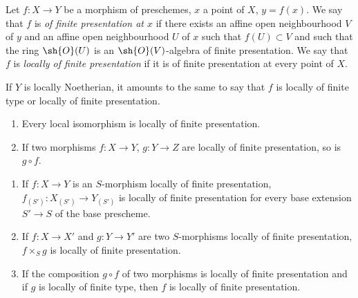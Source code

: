 \begin{definition}[1.4.2]
\label{IV.1.4.2}
Let $f:X\to Y$ be a morphism of preschemes, $x$ a point of $X$, $y=f(x)$.
We say that $f$ is \emph{of finite presentation at $x$} if there exists an affine open neighbourhood $V$ of $y$ and an affine open neighbourhood $U$ of $x$ such that $f(U)\subset V$ and such that the ring $\sh{O}(U)$ is an $\sh{O}(V)$-algebra of finite presentation.
We say that $f$ is \emph{locally of finite presentation} if it is of finite presentation at every point of $X$.
\end{definition}

If $Y$ is locally Noetherian, it amounts to the same to say that $f$ is locally of finite type or locally of finite presentation.

\begin{proposition}[1.4.3]
\label{IV.1.4.3}
\begin{enumerate}
  \item[\rm(i)] Every local isomorphism is locally of finite presentation.
  \item[\rm(ii)] If two morphisms $f:X\to Y$, $g:Y\to Z$ are locally of finite presentation, so is $g\circ f$.
\end{enumerate}
\end{proposition}

\begin{enumerate}
  \item[\rm(iii)] If $f:X\to Y$ is an $S$-morphism locally of finite presentation, $f_{(S')}:X_{(S')}\to Y_{(S')}$ is locally of finite presentation for every base extension $S'\to S$ of the base prescheme.
  \item[\rm(iv)] If $f:X\to X'$ and $g:Y\to Y'$ are two $S$-morphisms locally of finite presentation, $f\times_S g$ is locally of finite presentation.
  \item[\rm(v)] If the composition $g\circ f$ of two morphisms is locally of finite presentation and if $g$ is locally of finite type, then $f$ is locally of finite presentation.
\end{enumerate}

